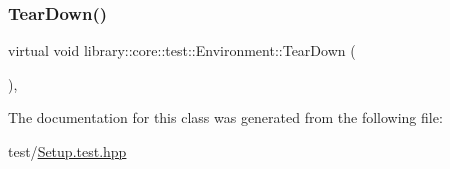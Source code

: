 \mbox{\label{classlibrary_1_1core_1_1test_1_1Environment_a3444effa83590e22490aac79d311853b}} 
\subsubsection{\texorpdfstring{Tear\+Down()}{TearDown()}}
{\footnotesize\ttfamily virtual void library\+::core\+::test\+::\+Environment\+::\+Tear\+Down (\begin{DoxyParamCaption}{ }\end{DoxyParamCaption})\hspace{0.3cm}{\ttfamily [inline]}, {\ttfamily [virtual]}}



The documentation for this class was generated from the following file\+:\begin{DoxyCompactItemize}
\item 
test/\hyperlink{Setup_8test_8hpp}{Setup.\+test.\+hpp}\end{DoxyCompactItemize}
